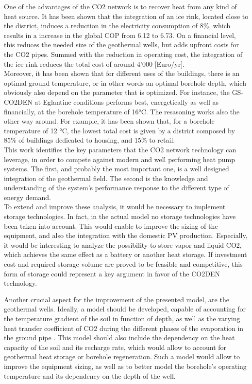 \documentclass{article}
\begin{document}
One of the advantages of the CO2 network is to recover heat from any kind of heat source. It has been shown that the integration of an ice rink, located close to the district, induces a reduction in the electricity consumption of 8\%, which results in a increase in the global COP from 6.12 to 6.73. On a financial level, this reduces the needed size of the geothermal wells, but adds upfront costs for the CO2 pipes. Summed with the reduction in operating cost, the integration of the ice rink reduces the total cost of around 4'000 [Euro/yr].\\

Moreover, it has been shown that for different uses of the buildings, there is an optimal ground temperature, or in other words an optimal borehole depth, which obviously also depend on the parameter that is optimized. For instance, the GS-CO2DEN at Eglantine conditions performs best, energetically as well as financially, at the borehole temperature of 16\si{\celsius}. The resasoning works also the other way around. For example, it has been shown that, for a borehole temperature of 12 \si{\celsius}, the lowest total cost is given by a district composed by 85\% of buildings dedicated to housing, and 15\% to retail.\\

This work identifies the key parameters that the CO2 network technology can leverage, in order to compete against modern and well performing heat pump systems. The first, and probably the most important one, is a well designed integration of the geothermal field. The second is the knowledge and understanding of the system's performance response to the different type of energy demand.\\

To extend and improve these analysis, it would be necessary to implement storage technologies. In fact, in the actual model no storage technologies have been taken into account. This would enable to improve the sizing of the equipment, and also the integration with the domestic PV production. Especially, it would be interesting to analyze the possibility to store vapor and liquid CO2, which achieves the same effect as a battery or another heat storage. If investment cost and required storage volume are proved to be feasible and competitive, this form of storage could represent a key argument in favor of the CO2DEN technology.

Another crucial aspect for the improvement of the presented model, are the geothermal wells. 
Ideally, a model should be developed, capable of accounting for the temperature gradient of the soil in function of depth, as well as the varying heat transfer coefficient of CO2 during the different phases of the evaporation in the ground pipe \cite{badacheExperimentalStudyCarbon2018,lamarcheReviewMethodsEvaluate2010}.
This model should also include the dependency on the heat capacity of the soil and its recharge rate\cite{jiaReviewEffectiveThermal2019,lamarcheReviewMethodsEvaluate2010,zengHeatTransferAnalysis2003a}, which would allow to account for geothermal heat storage or borehole regeneration.
Such a model would allow to improve the equipment sizing, as well as to better model the borehole's operating temperature and its dependency on the depth of the well.
 
\end{document}
